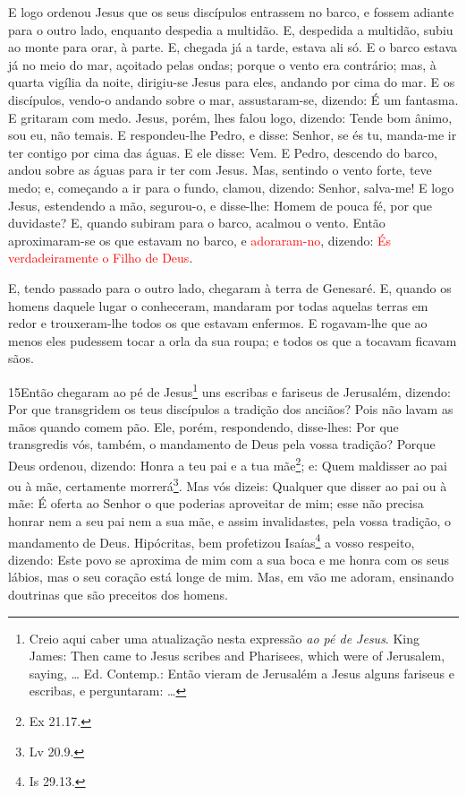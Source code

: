 E logo ordenou Jesus que os seus discípulos entrassem no barco, e
fossem adiante para o outro lado, enquanto despedia a multidão.
E, despedida a multidão, subiu ao monte para orar, à parte.
E, chegada já a tarde, estava ali só. E o barco estava já no
meio do mar, açoitado pelas ondas; porque o vento era contrário;
mas, à quarta vigília da noite, dirigiu-se Jesus para eles,
andando por cima do mar. E os discípulos, vendo-o andando
sobre o mar, assustaram-se, dizendo: É um fantasma. E gritaram com
medo. Jesus, porém, lhes falou logo, dizendo: Tende bom
ânimo, sou eu, não temais. E respondeu-lhe Pedro, e disse:
Senhor, se és tu, manda-me ir ter contigo por cima das águas.
E ele disse: Vem. E Pedro, descendo do barco, andou sobre as
águas para ir ter com Jesus. Mas, sentindo o vento forte,
teve medo; e, começando a ir para o fundo, clamou, dizendo: Senhor,
salva-me! E logo Jesus, estendendo a mão, segurou-o, e
disse-lhe: Homem de pouca fé, por que duvidaste? E, quando
subiram para o barco, acalmou o vento. Então aproximaram-se
os que estavam no barco, e \textcolor{red}{adoraram-no}, dizendo: \textcolor{red}{És
verdadeiramente o Filho de Deus}.

E, tendo passado para o outro lado, chegaram à terra de Genesaré.
E, quando os homens daquele lugar o conheceram, mandaram por
todas aquelas terras em redor e trouxeram-lhe todos os que estavam
enfermos. E rogavam-lhe que ao menos eles pudessem tocar a
orla da sua roupa; e todos os que a tocavam ficavam sãos.

\medskip

\lettrine{15} Então chegaram ao pé de Jesus\footnote{Creio
aqui caber uma atualização nesta expressão \emph{ao pé de Jesus}.
King James: Then came to Jesus scribes and Pharisees, which were of
Jerusalem, saying, \ldots{} Ed. Contemp.: Então vieram de Jerusalém
a Jesus alguns fariseus e escribas, e perguntaram: \dots{}} uns
escribas e fariseus de Jerusalém, dizendo: Por que transgridem
os teus discípulos a tradição dos anciãos? Pois não lavam as mãos
quando comem pão. Ele, porém, respondendo, disse-lhes: Por que
transgredis vós, também, o mandamento de Deus pela vossa tradição?
Porque Deus ordenou, dizendo: Honra a teu pai e a tua
mãe\footnote{Ex 21.17.}; e: Quem maldisser ao pai ou à mãe,
certamente morrerá\footnote{Lv 20.9.}. Mas vós dizeis: Qualquer
que disser ao pai ou à mãe: É oferta ao Senhor o que poderias
aproveitar de mim; esse não precisa honrar nem a seu pai nem a sua
mãe, e assim invalidastes, pela vossa tradição, o mandamento de
Deus. Hipócritas, bem profetizou Isaías\footnote{Is 29.13.} a
vosso respeito, dizendo: Este povo se aproxima de mim com a sua
boca e me honra com os seus lábios, mas o seu coração está longe de
mim. Mas, em vão me adoram, ensinando doutrinas que são
preceitos dos homens.

